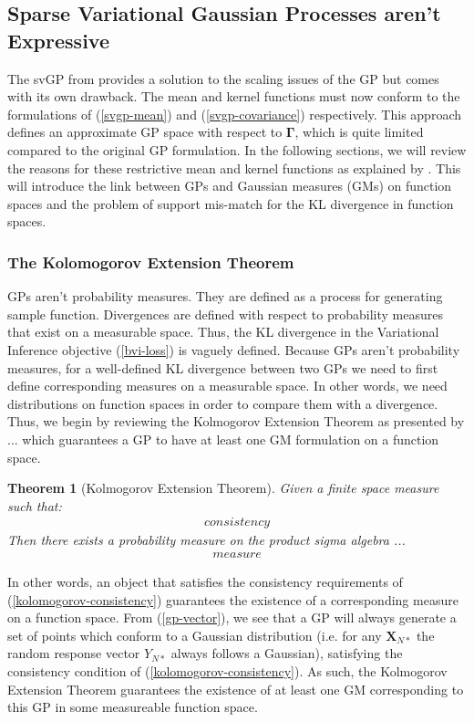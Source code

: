 \documentclass{article}
\newtheorem{theorem}{Theorem}
\numberwithin{equation}{section}
\begin{document}
\subsection{Sparse Variational Gaussian Processes aren't Expressive}\label{section:svgp-problems}
The svGP from \cite{titsias2009variational} provides a solution to the scaling issues of the GP but comes with its own drawback. The mean and kernel functions must now conform to the formulations of (\ref{svgp-mean}) and (\ref{svgp-covariance}) respectively. This approach defines an approximate GP space with respect to $\mathbf{\Gamma}$, which is quite limited compared to the original GP formulation. In the following sections, we will review the reasons for these restrictive mean and kernel functions as explained by \cite{matthews2017scalable}. This will introduce the link between GPs and Gaussian measures (GMs) on function spaces and the problem of support mis-match for the KL divergence in function spaces. 

\subsubsection{The Kolomogorov Extension Theorem}
GPs aren't probability measures. They are defined as a process for generating sample function. Divergences are defined with respect to probability measures that exist on a measurable space. Thus, the KL divergence in the Variational Inference objective (\ref{bvi-loss}) is vaguely defined.  Because GPs aren't probability measures, for a well-defined KL divergence between two GPs we need to first define corresponding measures on a measurable space. In other words, we need distributions on function spaces in order to compare them with a divergence.
Thus, we begin by reviewing the Kolmogorov Extension Theorem as presented by ... which guarantees a GP to have at least one GM formulation on a function space. 
\begin{theorem}[Kolmogorov Extension Theorem]
\label{kolomogorov-extension-theorem}
Given a finite space measure such that:
\begin{align}
    consistency 
    \label{kolomogorov-consistency}
\end{align}
Then there exists a probability measure on the product sigma algebra ... 
\begin{align}
    measure
    \label{kolomogorov-measure}
\end{align}
\end{theorem}
In other words, an object that satisfies the consistency requirements of (\ref{kolomogorov-consistency}) guarantees the existence of a corresponding measure on a function space. From (\ref{gp-vector}), we see that a GP will always generate a set of points which conform to a Gaussian distribution (i.e. for any $\mathbf{X}_{N*}$ the random response vector $Y_{N*}$ always follows a Gaussian), satisfying the consistency condition of (\ref{kolomogorov-consistency}). As such, the Kolmogorov Extension Theorem guarantees the existence of at least one GM corresponding to this GP in some measureable function space. 
\end{document}

